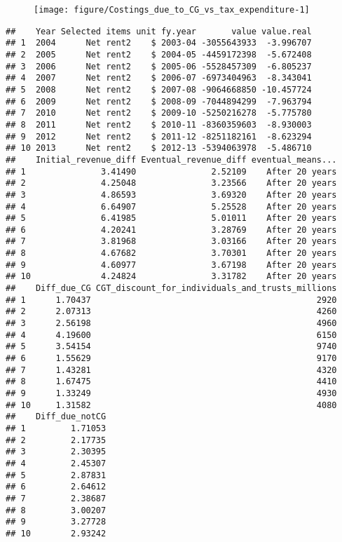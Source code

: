 \documentclass{grattan}\usepackage[]{graphicx}\usepackage[]{color}
\makeatletter
\newenvironment{kframe}{%
 \def\at@end@of@kframe{}%
 \ifinner\ifhmode%
  \def\at@end@of@kframe{\end{minipage}}%
  \begin{minipage}{\columnwidth}%
 \fi\fi%
 \def\FrameCommand##1{\hskip\@totalleftmargin \hskip-\fboxsep
 \colorbox{shadecolor}{##1}\hskip-\fboxsep
     \hskip-\linewidth \hskip-\@totalleftmargin \hskip\columnwidth}%
 \MakeFramed {\advance\hsize-\width
   \@totalleftmargin\z@ \linewidth\hsize
   \@setminipage}}%
 {\par\unskip\endMakeFramed%
 \at@end@of@kframe}
\newenvironment{knitrout}{}{} %
\makeatother
\begin{document}
\begin{figure}
\texttt{[image: figure/Costings\_due\_to\_CG\_vs\_tax\_expenditure-1]}
\notes{}
\end{figure}

\begin{knitrout}
\color{fgcolor}\begin{kframe}
\begin{verbatim}
##    Year Selected items unit fy.year       value value.real
## 1  2004      Net rent2    $ 2003-04 -3055643933  -3.996707
## 2  2005      Net rent2    $ 2004-05 -4459172398  -5.672408
## 3  2006      Net rent2    $ 2005-06 -5528457309  -6.805237
## 4  2007      Net rent2    $ 2006-07 -6973404963  -8.343041
## 5  2008      Net rent2    $ 2007-08 -9064668850 -10.457724
## 6  2009      Net rent2    $ 2008-09 -7044894299  -7.963794
## 7  2010      Net rent2    $ 2009-10 -5250216278  -5.775780
## 8  2011      Net rent2    $ 2010-11 -8360359603  -8.930003
## 9  2012      Net rent2    $ 2011-12 -8251182161  -8.623294
## 10 2013      Net rent2    $ 2012-13 -5394063978  -5.486710
##    Initial_revenue_diff Eventual_revenue_diff eventual_means...
## 1               3.41490               2.52109    After 20 years
## 2               4.25048               3.23566    After 20 years
## 3               4.86593               3.69320    After 20 years
## 4               6.64907               5.25528    After 20 years
## 5               6.41985               5.01011    After 20 years
## 6               4.20241               3.28769    After 20 years
## 7               3.81968               3.03166    After 20 years
## 8               4.67682               3.70301    After 20 years
## 9               4.60977               3.67198    After 20 years
## 10              4.24824               3.31782    After 20 years
##    Diff_due_CG CGT_discount_for_individuals_and_trusts_millions
## 1      1.70437                                             2920
## 2      2.07313                                             4260
## 3      2.56198                                             4960
## 4      4.19600                                             6150
## 5      3.54154                                             9740
## 6      1.55629                                             9170
## 7      1.43281                                             4320
## 8      1.67475                                             4410
## 9      1.33249                                             4930
## 10     1.31582                                             4080
##    Diff_due_notCG
## 1         1.71053
## 2         2.17735
## 3         2.30395
## 4         2.45307
## 5         2.87831
## 6         2.64612
## 7         2.38687
## 8         3.00207
## 9         3.27728
## 10        2.93242
\end{verbatim}
\end{kframe}
\end{knitrout}
\end{document}

